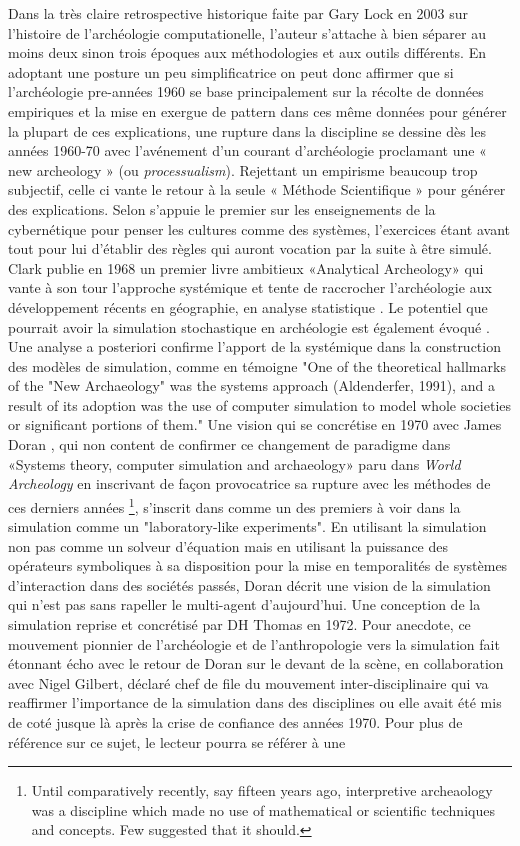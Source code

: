 {Dans la très claire retrospective historique faite par Gary Lock en 2003\cite{Lock2003} sur l'histoire de l'archéologie computationelle, l'auteur s'attache à bien séparer au moins deux sinon trois époques aux méthodologies et aux outils différents. En adoptant une posture un peu simplificatrice on peut donc affirmer que si l'archéologie pre-années 1960 se base principalement sur la récolte de données empiriques et la mise en exergue de pattern dans ces même données pour générer la plupart de ces explications, une rupture dans la discipline se dessine dès les années 1960-70 avec l'avénement d'un courant d'archéologie proclamant une « new archeology » (ou \emph{processualism}). Rejettant un empirisme beaucoup trop subjectif, celle ci vante le retour à la seule « Méthode Scientifique » pour générer des explications. Selon \autocite{Kohler2011} \autocite{Flanery1968} s'appuie le premier sur les enseignements de la cybernétique pour penser les cultures comme des systèmes, l'exercices étant avant tout pour lui d'établir des règles qui auront vocation par la suite à être simulé. Clark publie en 1968 un premier livre ambitieux «Analytical Archeology» qui vante à son tour l'approche systémique et tente de raccrocher l'archéologie aux développement récents en géographie, en analyse statistique \autocite{Kohler2011}. Le potentiel que pourrait avoir la simulation stochastique en archéologie est également évoqué \autocite{Clarke1968}. Une analyse a posteriori confirme l'apport de la systémique dans la construction des modèles de simulation, comme en témoigne \autocite{Aldenderfer1998} "One of the theoretical hallmarks of the "New Archaeology" was the systems approach (Aldenderfer, 1991), and a result of its adoption was the use of computer simulation to model whole societies or significant portions of them." Une vision qui se concrétise en 1970 avec James Doran \autocite{Doran1970} , qui non content de confirmer ce changement de paradigme dans  «Systems theory, computer simulation and archaeology» paru dans \emph{World Archeology} en inscrivant de façon provocatrice sa rupture avec les méthodes de ces derniers années \footnote{Until comparatively recently, say fifteen years ago, interpretive archeaology was a discipline which made no use of mathematical or scientific techniques and concepts. Few suggested that it should.}, s'inscrit dans comme un des premiers à voir dans la simulation comme un "laboratory-like experiments". En utilisant la simulation non pas comme un solveur d'équation mais en utilisant la puissance des opérateurs symboliques à sa disposition pour la mise en temporalités de systèmes d'interaction dans des sociétés passés, Doran décrit une vision de la simulation qui n'est pas sans rapeller le multi-agent d'aujourd'hui. Une conception de la simulation reprise et concrétisé par DH Thomas en 1972. Pour anecdote, ce mouvement pionnier de l'archéologie et de l'anthropologie vers la simulation fait étonnant écho avec le retour de Doran sur le devant de la scène, en collaboration avec Nigel Gilbert, déclaré chef de file du mouvement inter-disciplinaire qui va reaffirmer l'importance de la simulation dans des disciplines ou elle avait été mis de coté jusque là après la crise de confiance des années 1970. Pour plus de référence sur ce sujet, le lecteur pourra se référer à une }
